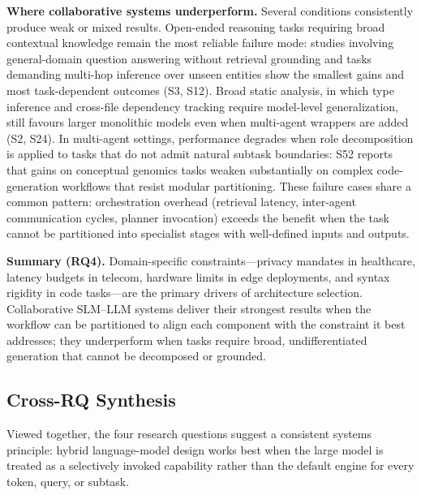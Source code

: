 \noindent\textbf{Where collaborative systems underperform.} Several conditions consistently produce weak or mixed results. Open-ended reasoning tasks requiring broad contextual knowledge remain the most reliable failure mode: studies involving general-domain question answering without retrieval grounding and tasks demanding multi-hop inference over unseen entities show the smallest gains and most task-dependent outcomes (S3, S12). Broad static analysis, in which type inference and cross-file dependency tracking require model-level generalization, still favours larger monolithic models even when multi-agent wrappers are added (S2, S24). In multi-agent settings, performance degrades when role decomposition is applied to tasks that do not admit natural subtask boundaries: S52 reports that gains on conceptual genomics tasks weaken substantially on complex code-generation workflows that resist modular partitioning. These failure cases share a common pattern: orchestration overhead (retrieval latency, inter-agent communication cycles, planner invocation) exceeds the benefit when the task cannot be partitioned into specialist stages with well-defined inputs and outputs.

\noindent\textbf{Summary (RQ4).} Domain-specific constraints---privacy mandates in healthcare, latency budgets in telecom, hardware limits in edge deployments, and syntax rigidity in code tasks---are the primary drivers of architecture selection. Collaborative SLM--LLM systems deliver their strongest results when the workflow can be partitioned to align each component with the constraint it best addresses; they underperform when tasks require broad, undifferentiated generation that cannot be decomposed or grounded.

\subsection{Cross-RQ Synthesis}
\label{sec:cross_rq}
Viewed together, the four research questions suggest a consistent systems principle: hybrid language-model design works best when the large model is treated as a selectively invoked capability rather than the default engine for every token, query, or subtask.

